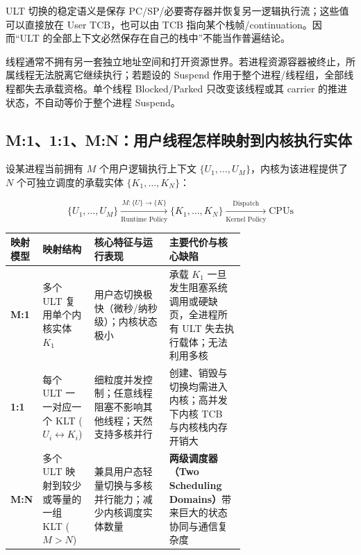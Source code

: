 \documentclass[11pt,a4paper]{ctexart}
\newcommand{\kw}[1]{\textbf{#1}}
\begin{document}
ULT 切换的稳定语义是保存 PC/SP/必要寄存器并恢复另一逻辑执行流；这些值可以直接放在 User TCB，也可以由 TCB 指向某个栈帧/continuation。因而“ULT 的全部上下文必然保存在自己的栈中”不能当作普遍结论。

\begin{exam}
线程通常不拥有另一套独立地址空间和打开资源世界。若进程资源容器被终止，所属线程无法脱离它继续执行；若题设的 Suspend 作用于整个进程/线程组，全部线程都失去承载资格。单个线程 Blocked/Parked 只改变该线程或其 carrier 的推进状态，不自动等价于整个进程 Suspend。
\end{exam}

\subsection{M:1、1:1、M:N：用户线程怎样映射到内核执行实体}

\begin{center}

\end{center}

设某进程当前拥有 $M$ 个用户逻辑执行上下文 $\{U_1,\dots,U_M\}$，内核为该进程提供了 $N$ 个可独立调度的承载实体 $\{K_1,\dots,K_N\}$：

\[
\boxed{
\{U_1,\dots,U_M\}
\xrightarrow[\text{Runtime Policy}]{M: \{U\} \to \{K\}}
\{K_1,\dots,K_N\}
\xrightarrow[\text{Kernel Policy}]{\text{Dispatch}}
\text{CPUs}
}
\]

\begingroup
\small
\renewcommand{\arraystretch}{1.25}
\setlength{\tabcolsep}{4pt}
\begin{tabularx}{\linewidth}{>{\bfseries}p{0.13\linewidth} p{0.22\linewidth} p{0.32\linewidth} X}
\toprule
映射模型 & 映射结构 & 核心特征与运行表现 & 主要代价与核心缺陷\\
\midrule
M:1 & 多个 ULT 复用单个内核实体 $K_1$ & 用户态切换极快（微秒/纳秒级）；内核状态极小 & 承载 $K_1$ 一旦发生阻塞系统调用或硬缺页，全进程所有 ULT 失去执行载体；无法利用多核\\
1:1 & 每个 ULT 一一对应一个 KLT ($U_i \leftrightarrow K_i$) & 细粒度并发控制；任意线程阻塞不影响其他线程；天然支持多核并行 & 创建、销毁与切换均需进入内核；高并发下内核 TCB 与内核栈内存开销大\\
M:N & 多个 ULT 映射到较少或等量的一组 KLT ($M > N$) & 兼具用户态轻量切换与多核并行能力；减少内核调度实体数量 & \kw{两级调度器（Two Scheduling Domains）}带来巨大的状态协同与通信复杂度\\
\bottomrule
\end{tabularx}
\endgroup
\end{document}
